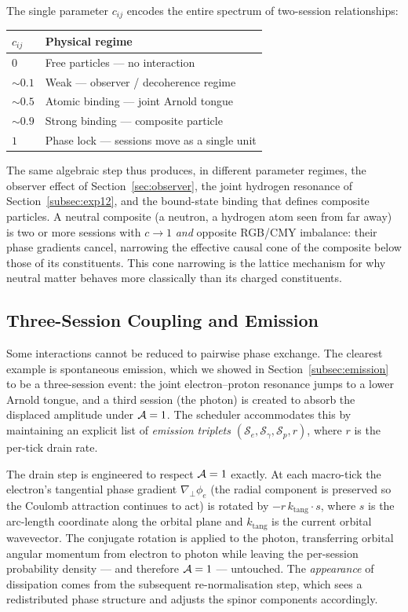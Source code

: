 The single parameter $c_{ij}$ encodes the entire spectrum of two-session
relationships:

\medskip
\begin{center}
\begin{tabular}{ll}
\hline
$c_{ij}$ & Physical regime \\
\hline
$0$       & Free particles --- no interaction \\
$\sim 0.1$ & Weak --- observer / decoherence regime \\
$\sim 0.5$ & Atomic binding --- joint Arnold tongue \\
$\sim 0.9$ & Strong binding --- composite particle \\
$1$       & Phase lock --- sessions move as a single unit \\
\hline
\end{tabular}
\end{center}
\medskip

The same algebraic step thus produces, in different parameter regimes,
the observer effect of Section~\ref{sec:observer}, the joint hydrogen
resonance of Section~\ref{subsec:exp12}, and the bound-state binding
that defines composite particles.
A neutral composite (a neutron, a hydrogen atom seen from far away) is
two or more sessions with $c \to 1$ \emph{and} opposite RGB/CMY
imbalance: their phase gradients cancel, narrowing the effective causal
cone of the composite below those of its constituents.
This cone narrowing is the lattice mechanism for why neutral matter
behaves more classically than its charged constituents.

\subsection{Three-Session Coupling and Emission}
\label{subsec:emission_coupling}

Some interactions cannot be reduced to pairwise phase exchange.
The clearest example is spontaneous emission, which we showed in
Section~\ref{subsec:emission} to be a three-session event: the joint
electron--proton resonance jumps to a lower Arnold tongue, and a third
session (the photon) is created to absorb the displaced amplitude under
$\mathcal{A}=1$.
The scheduler accommodates this by maintaining an explicit list of
\emph{emission triplets} $(\mathcal{S}_e, \mathcal{S}_\gamma,
\mathcal{S}_p, r)$, where $r$ is the per-tick drain rate.

The drain step is engineered to respect $\mathcal{A}=1$ exactly.
At each macro-tick the electron's tangential phase gradient
$\nabla_\perp\phi_e$ (the radial component is preserved so the Coulomb
attraction continues to act) is rotated by $-r\,k_\text{tang}\cdot s$,
where $s$ is the arc-length coordinate along the orbital plane and
$k_\text{tang}$ is the current orbital wavevector.
The conjugate rotation is applied to the photon, transferring orbital
angular momentum from electron to photon while leaving the per-session
probability density --- and therefore $\mathcal{A}=1$ --- untouched.
The \emph{appearance} of dissipation comes from the subsequent
re-normalisation step, which sees a redistributed phase structure and
adjusts the spinor components accordingly.

